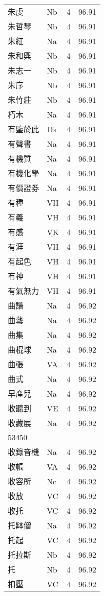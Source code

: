 \documentclass[twocolumn]{book}
\begin{document}
\begin{supertabular}{llrr}
朱虔 & Nb & 4 &  96.91\\
朱哲琴 & Nb & 4 &  96.91\\
朱紅 & Na & 4 &  96.91\\
朱和興 & Nb & 4 &  96.91\\
朱志一 & Nb & 4 &  96.91\\
朱序 & Nb & 4 &  96.91\\
朱竹莊 & Nb & 4 &  96.91\\
朽木 & Na & 4 &  96.91\\
有鑒於此 & Dk & 4 &  96.91\\
有聲書 & Na & 4 &  96.91\\
有機質 & Na & 4 &  96.91\\
有機化學 & Na & 4 &  96.91\\
有價證券 & Na & 4 &  96.91\\
有種 & VH & 4 &  96.91\\
有義 & VH & 4 &  96.91\\
有感 & VK & 4 &  96.91\\
有涯 & VH & 4 &  96.91\\
有起色 & VH & 4 &  96.91\\
有神 & VH & 4 &  96.91\\
有氣無力 & VH & 4 &  96.91\\
曲譜 & Na & 4 &  96.92\\
曲藝 & Na & 4 &  96.92\\
曲集 & Na & 4 &  96.92\\
曲棍球 & Na & 4 &  96.92\\
曲張 & VA & 4 &  96.92\\
曲式 & Na & 4 &  96.92\\
早產兒 & Na & 4 &  96.92\\
收聽到 & VE & 4 &  96.92\\
收藏展 & Na & 4 &  96.92\\
53450\\
收錄音機 & Na & 4 &  96.92\\
收帳 & VA & 4 &  96.92\\
收容所 & Nc & 4 &  96.92\\
收放 & VC & 4 &  96.92\\
收托 & VC & 4 &  96.92\\
托缽僧 & Na & 4 &  96.92\\
托起 & VC & 4 &  96.92\\
托拉斯 & Nb & 4 &  96.92\\
托 & Nb & 4 &  96.92\\
扣壓 & VC & 4 &  96.92\\

\end{supertabular}
\end{document}
